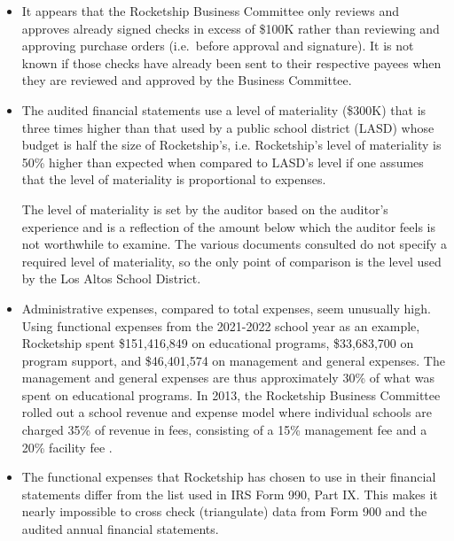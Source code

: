 \begin{itemize}
  \item It appears that the Rocketship Business Committee only reviews and approves already signed checks in excess of \$100K rather than reviewing and approving purchase orders (i.e.~before approval and signature). It is not known if those checks have already been sent to their respective payees when they are reviewed and approved by the Business Committee.

  \item The audited financial statements use a level of materiality (\$300K) that is three times higher than that used by a public school district (LASD) whose budget is half the size of Rocketship's, i.e. Rocketship's level of materiality is 50\% higher than expected when compared to LASD's level if one assumes that the level of materiality is proportional to expenses.

The level of materiality is set by the auditor based on the auditor's experience and is a reflection of the amount below which the auditor feels is not worthwhile to examine. The various documents consulted \parencite{FCMAT2020a,EAAP2023} do not specify a required level of materiality, so the only point of comparison is the level used by the Los Altos School District.

\item Administrative expenses, compared to total expenses, seem unusually high. Using functional expenses from the 2021-2022 school year as an example, Rocketship spent \$151,416,849 on educational programs, \$33,683,700 on program support, and \$46,401,574 on management and general expenses.  The management and general expenses are thus approximately 30\% of what was spent on educational programs. In 2013, the Rocketship Business Committee rolled out a school revenue and expense model where individual schools are charged 35\% of revenue in fees, consisting of a 15\% management fee and a 20\% facility fee \parencite[28]{Mukhopadhyay2013}.

  \item The functional expenses that Rocketship has chosen to use in their financial statements differ from the list used in IRS Form 990, Part IX\@. This makes it nearly impossible to cross check (triangulate) data from Form 900 and the audited annual financial statements.


\end{itemize}
